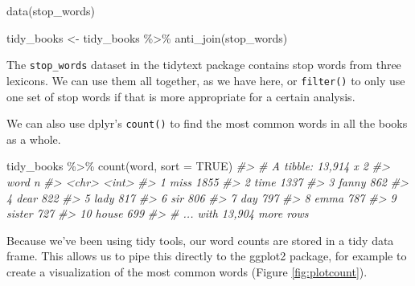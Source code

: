 \documentclass[
]{book}
\newenvironment{Shaded}{\begin{snugshade}}{\end{snugshade}}
\newcommand{\AttributeTok}[1]{\textcolor[rgb]{0.77,0.63,0.00}{#1}}
\newcommand{\CommentTok}[1]{\textcolor[rgb]{0.56,0.35,0.01}{\textit{#1}}}
\newcommand{\ConstantTok}[1]{\textcolor[rgb]{0.00,0.00,0.00}{#1}}
\newcommand{\FunctionTok}[1]{\textcolor[rgb]{0.00,0.00,0.00}{#1}}
\newcommand{\NormalTok}[1]{#1}
\newcommand{\OtherTok}[1]{\textcolor[rgb]{0.56,0.35,0.01}{#1}}
\newcommand{\SpecialCharTok}[1]{\textcolor[rgb]{0.00,0.00,0.00}{#1}}
\begin{document}
\begin{Shaded}
\begin{Highlighting}[]
\FunctionTok{data}\NormalTok{(stop\_words)}

\NormalTok{tidy\_books }\OtherTok{\textless{}{-}}\NormalTok{ tidy\_books }\SpecialCharTok{\%\textgreater{}\%}
  \FunctionTok{anti\_join}\NormalTok{(stop\_words)}
\end{Highlighting}
\end{Shaded}

The \texttt{stop\_words} dataset in the tidytext package contains stop words from three lexicons. We can use them all together, as we have here, or \texttt{filter()} to only use one set of stop words if that is more appropriate for a certain analysis.

We can also use dplyr's \texttt{count()} to find the most common words in all the books as a whole.

\begin{Shaded}
\begin{Highlighting}[]
\NormalTok{tidy\_books }\SpecialCharTok{\%\textgreater{}\%}
  \FunctionTok{count}\NormalTok{(word, }\AttributeTok{sort =} \ConstantTok{TRUE}\NormalTok{) }
\CommentTok{\#\textgreater{} \# A tibble: 13,914 x 2}
\CommentTok{\#\textgreater{}    word       n}
\CommentTok{\#\textgreater{}    \textless{}chr\textgreater{}  \textless{}int\textgreater{}}
\CommentTok{\#\textgreater{}  1 miss    1855}
\CommentTok{\#\textgreater{}  2 time    1337}
\CommentTok{\#\textgreater{}  3 fanny    862}
\CommentTok{\#\textgreater{}  4 dear     822}
\CommentTok{\#\textgreater{}  5 lady     817}
\CommentTok{\#\textgreater{}  6 sir      806}
\CommentTok{\#\textgreater{}  7 day      797}
\CommentTok{\#\textgreater{}  8 emma     787}
\CommentTok{\#\textgreater{}  9 sister   727}
\CommentTok{\#\textgreater{} 10 house    699}
\CommentTok{\#\textgreater{} \# ... with 13,904 more rows}
\end{Highlighting}
\end{Shaded}

Because we've been using tidy tools, our word counts are stored in a tidy data frame. This allows us to pipe this directly to the ggplot2 package, for example to create a visualization of the most common words (Figure \ref{fig:plotcount}).
\end{document}
